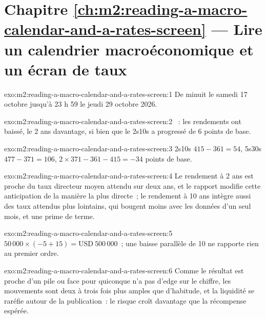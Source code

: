 \section*{Chapitre \ref{ch:m2:reading-a-macro-calendar-and-a-rates-screen} --- Lire un calendrier macroéconomique et un écran de taux}

\begin{solution}{exo:m2:reading-a-macro-calendar-and-a-rates-screen:1}
De minuit le samedi 17 octobre jusqu'à 23 h 59 le jeudi 29 octobre 2026.
\end{solution}

\begin{solution}{exo:m2:reading-a-macro-calendar-and-a-rates-screen:2}
~: les rendements ont baissé, le 2 ans davantage, si bien que le 2s10s a progressé de 6 points de base.
\end{solution}

\begin{solution}{exo:m2:reading-a-macro-calendar-and-a-rates-screen:3}
2s10s $415 - 361 = 54$, 5s30s $477 - 371 = 106$,  $2 \times 371 - 361 - 415 = -34$ points
de base.
\end{solution}

\begin{solution}{exo:m2:reading-a-macro-calendar-and-a-rates-screen:4}
Le rendement à 2 ans est proche du taux directeur moyen attendu sur deux ans, et le
rapport modifie cette anticipation de la manière la plus directe~; le rendement à 10 ans intègre aussi des taux attendus
plus lointains, qui bougent moins avec les données d'un seul mois, et une prime de terme.
\end{solution}

\begin{solution}{exo:m2:reading-a-macro-calendar-and-a-rates-screen:5}
$50\,000 \times (-5 + 15) = \text{USD}~500\,000$~; une baisse parallèle de 10 ne rapporte rien au
premier ordre.
\end{solution}

\begin{solution}{exo:m2:reading-a-macro-calendar-and-a-rates-screen:6}
Comme le résultat est proche d'un pile ou face pour quiconque n'a pas d'edge sur le chiffre, les
mouvements sont deux à trois fois plus amples que d'habitude, et la liquidité se raréfie autour de la publication~:
le risque croît davantage que la récompense espérée.
\end{solution}

